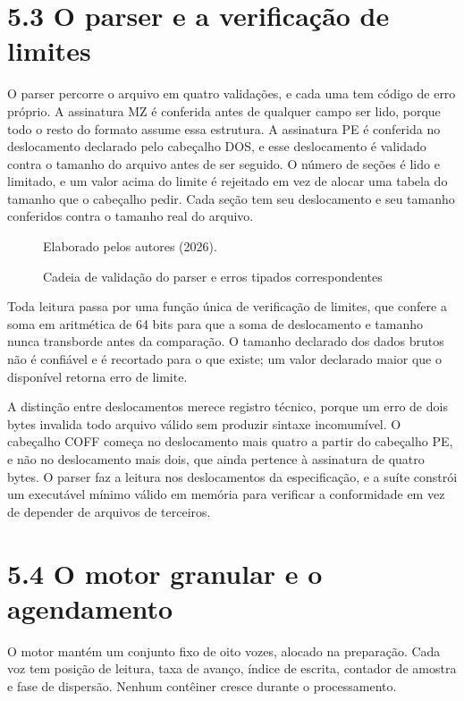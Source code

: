 \documentclass[12pt,a4paper]{article}
\begin{document}
\section*{5.3 O parser e a verificação de limites}

O parser percorre o arquivo em quatro validações, e cada uma tem código de erro próprio. A assinatura MZ é conferida antes de qualquer campo ser lido, porque todo o resto do formato assume essa estrutura. A assinatura PE é conferida no deslocamento declarado pelo cabeçalho DOS, e esse deslocamento é validado contra o tamanho do arquivo antes de ser seguido. O número de seções é lido e limitado, e um valor acima do limite é rejeitado em vez de alocar uma tabela do tamanho que o cabeçalho pedir. Cada seção tem seu deslocamento e seu tamanho conferidos contra o tamanho real do arquivo.


\begin{figure}
\centering
\resizebox{\textwidth}{!}{}
\caption{Cadeia de validação do parser e erros tipados correspondentes}
\label{fig:parser}
{\footnotesize Elaborado pelos autores (2026).\par}
\end{figure}

Toda leitura passa por uma função única de verificação de limites, que confere a soma em aritmética de 64 bits para que a soma de deslocamento e tamanho nunca transborde antes da comparação. O tamanho declarado dos dados brutos não é confiável e é recortado para o que existe; um valor declarado maior que o disponível retorna erro de limite.


A distinção entre deslocamentos merece registro técnico, porque um erro de dois bytes invalida todo arquivo válido sem produzir sintaxe incomumível. O cabeçalho COFF começa no deslocamento mais quatro a partir do cabeçalho PE, e não no deslocamento mais dois, que ainda pertence à assinatura de quatro bytes. O parser faz a leitura nos deslocamentos da especificação, e a suíte constrói um executável mínimo válido em memória para verificar a conformidade em vez de depender de arquivos de terceiros.


\section*{5.4 O motor granular e o agendamento}

O motor mantém um conjunto fixo de oito vozes, alocado na preparação. Cada voz tem posição de leitura, taxa de avanço, índice de escrita, contador de amostra e fase de dispersão. Nenhum contêiner cresce durante o processamento.
\end{document}

